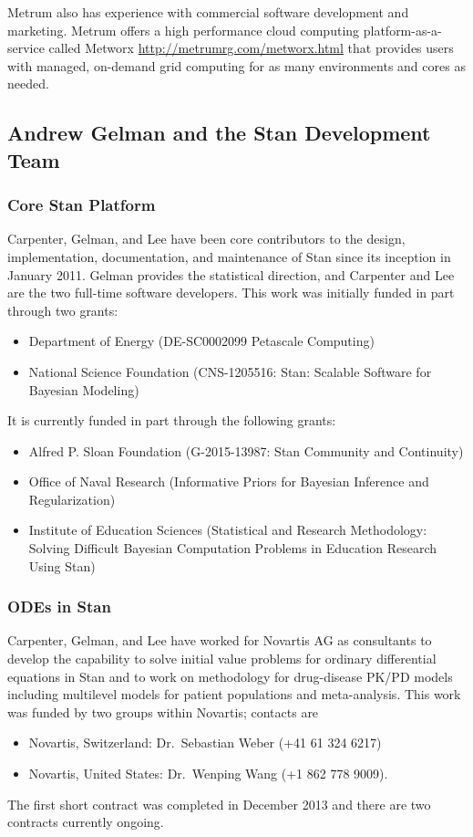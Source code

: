 \documentclass[11pt]{nih2016}
\begin{document}
Metrum also has experience with commercial software development and
marketing. Metrum offers a high performance cloud computing
platform-as-a-service called Metworx
\url{http://metrumrg.com/metworx.html} that provides users with
managed, on-demand grid computing for as many environments and cores
as needed.

\subsection{Andrew Gelman and the Stan Development Team}

\subsubsection{Core Stan Platform}

Carpenter, Gelman, and Lee have been core contributors to the design,
implementation, documentation, and maintenance of Stan since its
inception in January 2011.  Gelman provides the statistical direction,
and Carpenter and Lee are the two full-time software developers.  This
work was initially funded in part through two grants:
%
\begin{itemize}
\item Department of Energy  (DE-SC0002099 Petascale Computing)
\item National Science Foundation (CNS-1205516: Stan: Scalable
  Software for Bayesian Modeling) 
\end{itemize}
%
It is currently funded in part through the following grants:
%
\begin{itemize}
\item Alfred P. Sloan Foundation 
(G-2015-13987: Stan Community and Continuity)
\item Office of Naval Research 
(Informative Priors for Bayesian Inference and Regularization)
\item 
Institute of Education Sciences 
(Statistical and Research Methodology: Solving Difficult Bayesian
Computation Problems in Education Research Using Stan)
\end{itemize}


\subsubsection{ODEs in Stan}

Carpenter, Gelman, and Lee have worked for Novartis AG as consultants
to develop the capability to solve initial value problems for ordinary
differential equations in Stan and to work on methodology for
drug-disease PK/PD models including multilevel models for patient
populations and meta-analysis.  This work was funded by two groups
within Novartis; contacts are
%
\begin{itemize}
\item Novartis, Switzerland: Dr.\ Sebastian Weber (+41 61 324 6217)
\item Novartis, United States: Dr.\ Wenping Wang (+1 862 778 9009).
\end{itemize}
%
The first short contract was completed in December 2013 and there are
two contracts currently ongoing.
\end{document}
